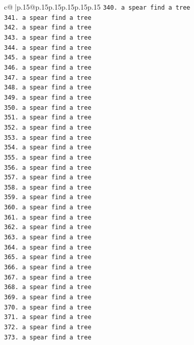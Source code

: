 \documentclass{article}
\begin{document}
{\begin{supertabular}{c@{$\;$}|p{.15\linewidth}@{}p{.15\linewidth}p{.15\linewidth}p{.15\linewidth}p{.15\linewidth}p{.15\linewidth}}
{{{\texttt{340. a spear find a tree} \\
\texttt{341. a spear find a tree} \\
\texttt{342. a spear find a tree} \\
\texttt{343. a spear find a tree} \\
\texttt{344. a spear find a tree} \\
\texttt{345. a spear find a tree} \\
\texttt{346. a spear find a tree} \\
\texttt{347. a spear find a tree} \\
\texttt{348. a spear find a tree} \\
\texttt{349. a spear find a tree} \\
\texttt{350. a spear find a tree} \\
\texttt{351. a spear find a tree} \\
\texttt{352. a spear find a tree} \\
\texttt{353. a spear find a tree} \\
\texttt{354. a spear find a tree} \\
\texttt{355. a spear find a tree} \\
\texttt{356. a spear find a tree} \\
\texttt{357. a spear find a tree} \\
\texttt{358. a spear find a tree} \\
\texttt{359. a spear find a tree} \\
\texttt{360. a spear find a tree} \\
\texttt{361. a spear find a tree} \\
\texttt{362. a spear find a tree} \\
\texttt{363. a spear find a tree} \\
\texttt{364. a spear find a tree} \\
\texttt{365. a spear find a tree} \\
\texttt{366. a spear find a tree} \\
\texttt{367. a spear find a tree} \\
\texttt{368. a spear find a tree} \\
\texttt{369. a spear find a tree} \\
\texttt{370. a spear find a tree} \\
\texttt{371. a spear find a tree} \\
\texttt{372. a spear find a tree} \\
\texttt{373. a spear find a tree} \\
}}}
\end{supertabular}}
\end{document}
